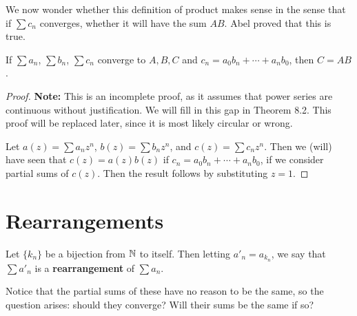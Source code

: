We now wonder whether this definition of product makes sense in the sense that if $\sum c_n$ converges, whether it will have the sum $AB$. Abel proved that this is true. 

\begin{theorem} %
If $\sum a_n$, $\sum b_n$, $\sum c_n$ converge to $A, B, C$ and $c_n = a_0 b_n + \dotsb + a_nb_0$, then $C = AB$.

\begin{proof}
\textbf{Note:} This is an incomplete proof, as it assumes that power series are continuous without justification. We will fill in this gap in Theorem 8.2. This proof will be replaced later, since it is most likely circular or wrong.

Let $a(z) = \sum a_nz^n$, $b(z) = \sum b_nz^n$, and $c(z) = \sum c_nz^n$. Then we (will) have seen that $c(z) = a(z)b(z)$ if $c_n = a_0b_n + \dotsb + a_nb_0$, if we consider partial sums of $c(z)$. Then the result follows by substituting $z = 1$.
\end{proof}
\end{theorem}

\section{Rearrangements}

\begin{definition}
Let $\{k_n\}$ be a bijection from $\mathbb{N}$ to itself. Then letting $a'_n = a_{k_n}$, we say that $\sum a'_n$ is a \textbf{rearrangement} of $\sum a_n$.

Notice that the partial sums of these have no reason to be the same, so the question arises: should they converge? Will their sums be the same if so?
\end{definition}

